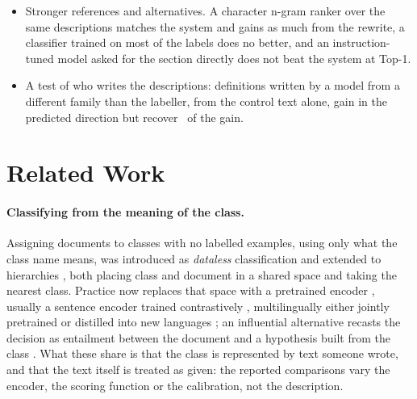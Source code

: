 \documentclass[11pt]{article}
\begin{document}
\begin{itemize}
        compares classes on a scale that depends on description style.
  \item Stronger references and alternatives. A character n-gram ranker over
        the same descriptions matches the system and gains as much from the
        rewrite, a classifier trained on most of the labels does no better, and
        an instruction-tuned model asked for the section directly does not beat
        the system at Top-1.
  \item A test of who writes the descriptions: definitions written by a model
        from a different family than the labeller, from the control text alone,
        gain in the predicted direction but recover \SourceWriterShare\ of the
        gain.
\end{itemize}

\section{Related Work}

\paragraph{Classifying from the meaning of the class.}
Assigning documents to classes with no labelled examples, using only what the
class name means, was introduced as \emph{dataless} classification
\citep{chang-etal-2008-importance} and extended to hierarchies
\citep{song-roth-2014-dataless}, both placing class and document in a shared
space and taking the nearest class. Practice now replaces that space with a
pretrained encoder \citep{devlin-etal-2019-bert}, usually a sentence encoder
trained contrastively \citep{reimers-gurevych-2019-sentence}, multilingually
either jointly pretrained \citep{conneau-etal-2020-unsupervised} or distilled
into new languages \citep{reimers-gurevych-2020-making}; an influential
alternative recasts the decision as entailment between the document and a
hypothesis built from the class \citep{yin-etal-2019-benchmarking}. What
these share is that the class is represented by text someone wrote, and that the
text itself is treated as given: the reported comparisons vary the encoder, the
scoring function or the calibration, not the description.
\end{document}
